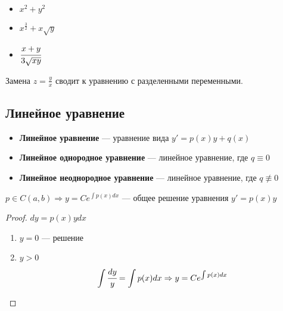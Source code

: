\begin{example}\itemfix
    \begin{itemize}
        \item $x^2 + y^2$
        \item$x^{\frac{3}{2}} + x\sqrt y$
        \item $\cfrac{x+y}{3\sqrt{xy}}$
    \end{itemize}
\end{example}

Замена $z=\frac{y}{x}$ сводит к уравнению с разделенными переменными.

\subsection{Линейное уравнение}

\begin{definition}\itemfix
    \begin{itemize}
        \item \textbf{Линейное уравнение} --- уравнение вида $y'=p(x)y + q(x)$
        \item \textbf{Линейное однородное уравнение} --- линейное уравнение, где $q\equiv 0$
        \item \textbf{Линейное неоднородное уравнение} --- линейное уравнение, где $q\not\equiv 0$
    \end{itemize}
\end{definition}

\begin{lemma}
    $p\in C(a, b) \Rightarrow y=Ce^{\int p(x)dx}$ --- общее решение уравнения $y'=p(x)y$
\end{lemma}
\begin{proof}
    $dy = p(x)ydx$

    \begin{enumerate}
        \item $y=0$ --- решение
        \item $y>0$
              $$\int\cfrac{dy}{y} = \int p(x)dx \Rightarrow y = Ce^{\int p(x)dx}$$
    \end{enumerate}
\end{proof}

